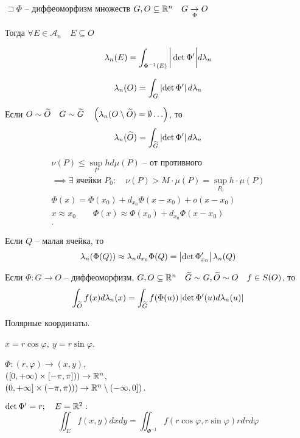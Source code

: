 \begin{theorem}
    $\sqsupset \Phi$ -- диффеоморфизм множеств $G, O\subseteq \mathbb{R}^n\quad G \underset \Phi \rightarrow O$

    Тогда $\forall E\in \mathscr A_n\quad E\subseteq O$
    
    \[\lambda_n (E) = \int_{\Phi^{-1}(E)} \bigg| \det \Phi^{\prime} \bigg| d \lambda_n
    \]

    \[\lambda_n(O) = \int_G \left|\det \Phi^{\prime}  \right|d\lambda_n \]
    
    Если $O\sim \widetilde{O}\quad G\sim \widetilde{G}\quad \left( \lambda_n(O \setminus \widetilde{O}) = \emptyset \ldots \right) $, то
    \[\lambda_n(\widetilde{O}) = \int_{\widetilde{G}} \left|\det \Phi^{\prime}  \right|d\lambda_n \]
\end{theorem}
\begin{note} %
    \begin{align*}
        \nu(P) \leqslant \sup_P hd\mu(P)\text{ -- от противного}\\
        \implies \exists \text{ ячейки } P_0:\quad \nu(P) > M\cdot \mu(P) = \sup_{P_0} h \cdot \mu(P)\\
        \Phi(x) = \Phi(x_0) + d_{x_0}\Phi(x - x_0) + o(x - x_0)\\
        x \approx x_0\qquad \Phi(x) \approx \Phi(x_0) + d_{x_0}\Phi(x - x_0)\\
    .\end{align*}

    Если $Q$ -- малая ячейка, то \[\lambda_n(\Phi(Q)) \approx \lambda_n d_{x_0}\Phi(Q) = \left| \det \Phi^{\prime}_{x_0} \right| \lambda_n(Q)\]
\end{note}

\begin{corollary}
    Если $\Phi: G \to O$ -- диффеоморфизм, $G, O \subseteq \mathbb{R}^n\quad \widetilde{G} \sim G, \widetilde{O}\sim O\quad f\in S(O)$, то 
    \[\int_{\widetilde{O}} f(x)d\lambda_n(x) = \int_{\widetilde{G}} f(\Phi(u)) \left| \det \Phi^{\prime}(u) d\lambda_n(u) \right| \]
\end{corollary}

\begin{example}
    Полярные координаты.
    
    $x = r \cos \varphi,~ y = r \sin \varphi$.
    
    $\Phi: (r, \varphi) \to (x, y)$,\\
    $([0, +\infty) \times [-\pi, \pi])) \to \mathbb{R}^n$,\\
    $(0, +\infty] \times (-\pi, \pi))) \to \mathbb{R}^n \setminus(-\infty, 0])$.

    $\det \Phi^{\prime} =r; ~~~E = \mathbb{R}^2: $
    \[
        \iint_E f(x, y) dx dy = \iint_{\Phi^{-1}} f(r\cos \varphi , r \sin\varphi) r dr d\varphi 
    \] 
 \end{example}

